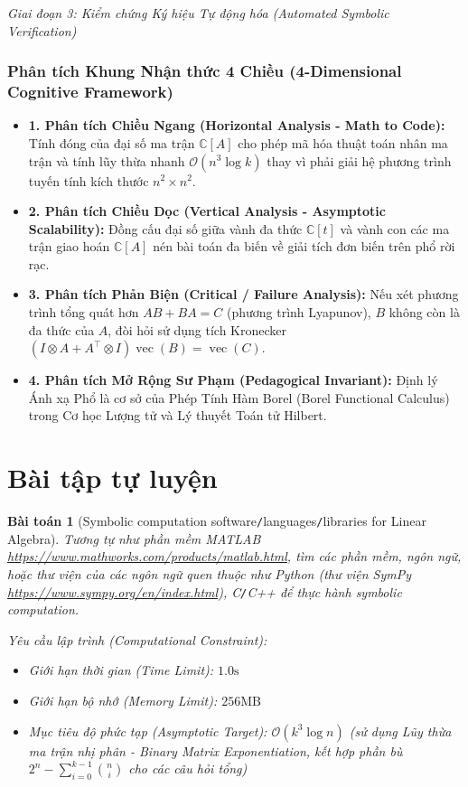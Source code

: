 \documentclass{article}
\newtheorem{baitoan}{Bài toán}
\begin{document}
\vspace{0.5em}\noindent\emph{Giai đoạn 3: Kiểm chứng Ký hiệu Tự động hóa (Automated Symbolic Verification)}


\subsubsection*{Phân tích Khung Nhận thức 4 Chiều (4-Dimensional Cognitive Framework)}
\begin{itemize}
    \item \textbf{1. Phân tích Chiều Ngang (Horizontal Analysis - Math to Code):} Tính đóng của đại số ma trận $\mathbb{C}[A]$ cho phép mã hóa thuật toán nhân ma trận và tính lũy thừa nhanh $\mathcal{O}(n^3 \log k)$ thay vì phải giải hệ phương trình tuyến tính kích thước $n^2 \times n^2$.
    \item \textbf{2. Phân tích Chiều Dọc (Vertical Analysis - Asymptotic Scalability):} Đồng cấu đại số giữa vành đa thức $\mathbb{C}[t]$ và vành con các ma trận giao hoán $\mathbb{C}[A]$ nén bài toán đa biến về giải tích đơn biến trên phổ rời rạc.
    \item \textbf{3. Phân tích Phản Biện (Critical / Failure Analysis):} Nếu xét phương trình tổng quát hơn $A B + B A = C$ (phương trình Lyapunov), $B$ không còn là đa thức của $A$, đòi hỏi sử dụng tích Kronecker $(I \otimes A + A^\top \otimes I) \operatorname{vec}(B) = \operatorname{vec}(C)$.
    \item \textbf{4. Phân tích Mở Rộng Sư Phạm (Pedagogical Invariant):} Định lý Ánh xạ Phổ là cơ sở của Phép Tính Hàm Borel (Borel Functional Calculus) trong Cơ học Lượng tử và Lý thuyết Toán tử Hilbert.
\end{itemize}

\section{Bài tập tự luyện}

\begin{baitoan}[Symbolic computation software{\tt/}languages{\tt/}libraries for Linear Algebra]
	Tương tự như phần mềm {\sf MATLAB} \url{https://www.mathworks.com/products/matlab.html}, tìm các phần mềm, ngôn ngữ, hoặc thư viện của các ngôn ngữ quen thuộc như {\sf Python} (thư viện {\sf SymPy} \url{https://www.sympy.org/en/index.html}), {\sf C{\tt/}C++} để thực hành symbolic computation.

    \vspace{0.5em}
    \emph{Yêu cầu lập trình (Computational Constraint):}
    \begin{itemize}
        \item Giới hạn thời gian (Time Limit): $1.0\mathrm{s}$
        \item Giới hạn bộ nhớ (Memory Limit): $256\mathrm{MB}$
        \item Mục tiêu độ phức tạp (Asymptotic Target): $\mathcal{O}(k^3 \log n)$ (sử dụng Lũy thừa ma trận nhị phân - Binary Matrix Exponentiation, kết hợp phần bù $2^n - \sum_{i=0}^{k-1} \binom{n}{i}$ cho các câu hỏi tổng)
    \end{itemize}
\end{baitoan}
\end{document}
